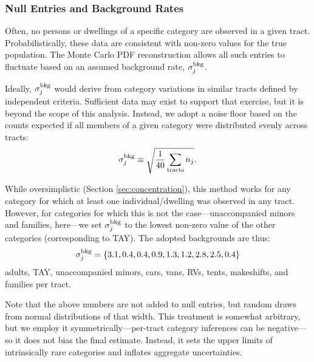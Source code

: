 \documentclass[11pt,twocolumn]{article}
\def\ntracts{40}
\begin{document}
\subsubsection{Null Entries and Background Rates}
\label{sec:nulls}

Often, no persons or dwellings of a specific category are observed in a given tract. Probabilistically, 
these data are consistent with non-zero values for the true population. The Monte Carlo 
PDF reconstruction allows all such entries to fluctuate based on an assumed background rate,
$\sigma_{j}^{\rm bkg}$. 

Ideally, $\sigma_{j}^{\rm bkg}$ would derive from category variations in similar tracts defined 
by independent criteria. Sufficient data may exist to support that exercise, but it is beyond the scope 
of this analysis. Instead, we adopt a noise floor based on the counts expected if all members of a given 
category were distributed evenly across tracts:
\begin{equation}
	\sigma_{j}^{\rm bkg} \equiv \sqrt{\frac{1}{\ntracts}\sum_{\rm tracts}n_{j}}.
\end{equation}

While oversimplistic (Section \ref{sec:concentration}), this method works for any category
for which at least one individual/dwelling was observed in any tract. However, for categories for 
which this is not the case---unaccompanied minors and families, here---we set 
$\sigma_{j}^{\rm bkg}$ to the lowest non-zero value of the other categories (corresponding to 
TAY). The adopted backgrounds are thus: 
\begin{equation}
	\sigma_{j}^{\rm bkg}=\{3.1, 0.4, 0.4, 0.9, 1.3, 1.2, 2.8, 2.5, 0.4\}
\end{equation}
adults, TAY, unaccompanied minors, cars, vans, RVs, tents, makeshifts, and families per tract. 

Note that the above numbers are not added to null entries, but random draws from normal distributions
of that width. This treatment is somewhat arbitrary, but we employ it symmetrically---per-tract category 
inferences can be negative---so it does not bias the final estimate. Instead, it sets the upper limits of 
intrinsically rare categories and inflates aggregate uncertainties.
\end{document}
